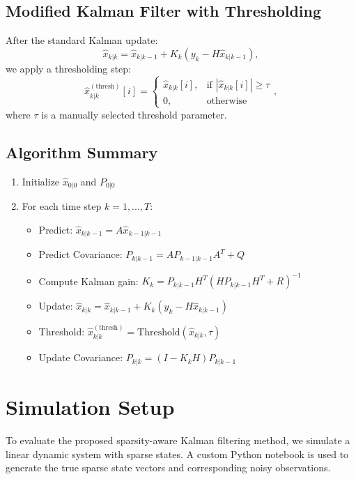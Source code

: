 \documentclass[12pt]{article}
\begin{document}
\subsection{Modified Kalman Filter with Thresholding}
After the standard Kalman update:
\begin{equation}
    \hat{x}_{k|k} = \hat{x}_{k|k-1} + K_k (y_k - H \hat{x}_{k|k-1}),
\end{equation}
we apply a thresholding step:
\begin{equation}
    \hat{x}_{k|k}^{(\text{thresh})}[i] =
    \begin{cases}
    \hat{x}_{k|k}[i], & \text{if } |\hat{x}_{k|k}[i]| \geq \tau \\
    0, & \text{otherwise}
    \end{cases},
\end{equation}
where $\tau$ is a manually selected threshold parameter.

\subsection{Algorithm Summary}
\begin{enumerate}
    \item Initialize $\hat{x}_{0|0}$ and $P_{0|0}$
    \item For each time step $k = 1, ..., T$:
    \begin{itemize}
        \item Predict: $\hat{x}_{k|k-1} = A \hat{x}_{k-1|k-1}$
        \item Predict Covariance: $P_{k|k-1} = A P_{k-1|k-1} A^T + Q$
        \item Compute Kalman gain: $K_k = P_{k|k-1} H^T (H P_{k|k-1} H^T + R)^{-1}$
        \item Update: $\hat{x}_{k|k} = \hat{x}_{k|k-1} + K_k (y_k - H \hat{x}_{k|k-1})$
        \item Threshold: $\hat{x}_{k|k}^{(\text{thresh})} = \text{Threshold}(\hat{x}_{k|k}, \tau)$
        \item Update Covariance: $P_{k|k} = (I - K_k H) P_{k|k-1}$
    \end{itemize}
\end{enumerate}

\section{Simulation Setup}

To evaluate the proposed sparsity-aware Kalman filtering method, we simulate a linear dynamic system with sparse states. A custom Python notebook is used to generate the true sparse state vectors and corresponding noisy observations.
\end{document}
